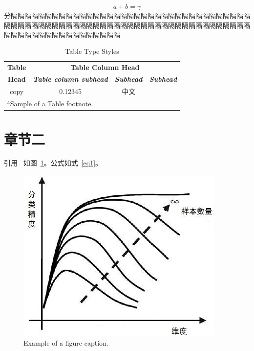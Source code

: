 \documentclass[UTF8,AutoFakeBold,a4paper,12pt]{article}
\begin{document}
\begin{equation}
    a+b=\gamma\label{eq}
\end{equation}
分隔隔隔隔隔隔隔隔隔隔隔隔隔隔隔隔隔隔隔隔隔隔隔隔隔隔隔隔隔隔隔隔隔隔隔隔隔隔隔隔隔隔隔隔隔隔隔隔隔隔隔隔隔隔隔隔隔隔隔隔隔隔隔隔隔隔隔隔隔隔隔隔隔隔隔隔隔隔隔隔隔隔隔隔隔隔隔隔
\begin{table}[htbp]
    \caption{Table Type Styles}
    \centering
    \begin{tabular}{|c|c|c|c|}
        \hline
        \textbf{Table} & \multicolumn{3}{|c|}{\textbf{Table Column Head}}                                                         \\
        \cline{2-4}
        \textbf{Head}  & \textbf{\textit{Table column subhead}}           & \textbf{\textit{Subhead}} & \textbf{\textit{Subhead}} \\
        \hline
        copy           & 0.12345                   &     中文                     &                           \\
        \hline
        \multicolumn{4}{l}{$^{\mathrm{a}}$Sample of a Table footnote.}
    \end{tabular}
    \label{tab1}
\end{table}

\section{章节二}
引用~\cite{example11}
如图~\ref{fig1}。公式如式~\ref{eq1}。
\begin{figure}[htbp]
    \centerline{\includegraphics{fig1.jpg}}
    \caption{Example of a figure caption.}
    \label{fig1}
\end{figure}
\end{document}
